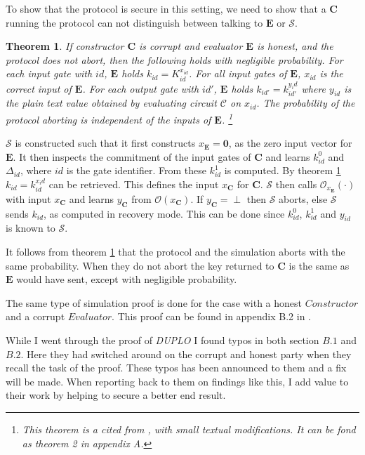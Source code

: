 \documentclass[twoside,11pt,openright]{report}
\newtheorem{theorem}{Theorem}
\newcommand{\DUPLO}{\textit{DUPLO} }
\begin{document}
To show that the protocol is secure in this setting, we need to show that a $\mathbf{C}$ running the protocol can not distinguish between talking to $\mathbf{E}$ or $\mathcal{S}$.

\begin{theorem}
\label{thm:2}
If constructor $\mathbf{C}$ is corrupt and evaluator $\mathbf{E}$ is honest, and the protocol does not abort, then the following holds with negligible probability. For each input gate with $id$, $\mathbf{E}$ holds $k_{id}=K^{x_{id}}_{id}$. For all input gates of $\mathbf{E}$, $x_{id}$ is the correct input of $\mathbf{E}$. For each output gate with $id'$, $\mathbf{E}$ holds $k_{id'}=k^{y_id}_{id'}$ where $y_{id}$ is the plain text value obtained by evaluating circuit $\mathcal{C}$ on $x_{id}$. The probability of the protocol aborting is independent of the inputs of $\mathbf{E}$.
\footnote{This theorem is a cited from \cite{duplo}, with small textual modifications. It can be fond as theorem 2 in appendix A.}
\end{theorem}

$\mathcal{S}$ is constructed such that it first constructs $x_\mathbf{E}=\mathbf{0}$, as the zero input vector for $\mathbf{E}$. It then inspects the commitment of the input gates of $\mathbf{C}$ and learns $k^0_{id}$ and $\Delta_{id}$, where $id$ is the gate identifier. From these $k^1_{id}$ is computed. By theorem \ref{thm:2} $k_{id}=k^{x_id}_{id}$ can be retrieved. This defines the input $x_\mathbf{C}$ for $\mathbf{C}$. $\mathcal{S}$ then calls $\mathcal{O}_{x_\mathbf{E}}(\cdot)$ with input $x_\mathbf{C}$ and learns $y_\mathbf{C}$ from $\mathcal{O}(x_\mathbf{C})$. If $y_\mathbf{C}=\perp$ then $\mathcal{S}$ aborts, else $\mathcal{S}$ sends $k_{id}$, as computed in recovery mode. This can be done since $k^0_{id}$, $k^1_{id}$ and $y_{id}$ is known to $\mathcal{S}$.

It follows from theorem \ref{thm:2} that the protocol and the simulation aborts with the same probability. When they do not abort the key returned to $\mathbf{C}$ is the same as $\mathbf{E}$ would have sent, except with negligible probability.

The same type of simulation proof is done for the case with a honest $Constructor$ and a corrupt $Evaluator$. This proof can be found in appendix B.2 in \cite{duplo}.

\bigskip

While I went through the proof of \DUPLO I found typos in both section $B.1$ and $B.2$. Here they had switched around on the corrupt and honest party when they recall the task of the proof. These typos has been announced to them and a fix will be made. When reporting back to them on findings like this, I add value to their work by helping to secure a better end result.
\end{document}
